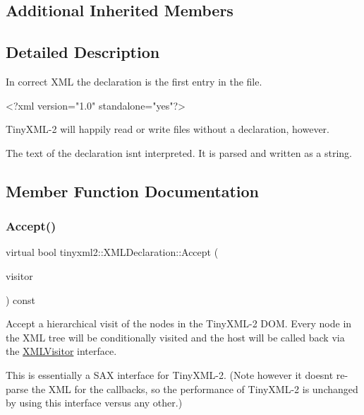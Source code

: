 \subsection*{Additional Inherited Members}


\subsection{Detailed Description}
In correct X\+ML the declaration is the first entry in the file. \begin{DoxyVerb}    <?xml version="1.0" standalone="yes"?>
\end{DoxyVerb}


Tiny\+X\+M\+L-\/2 will happily read or write files without a declaration, however.

The text of the declaration isn\textquotesingle{}t interpreted. It is parsed and written as a string. 

\subsection{Member Function Documentation}
\mbox{\label{classtinyxml2_1_1XMLDeclaration_a5f376019fb34752eb248548f42f32045}} 
\subsubsection{\texorpdfstring{Accept()}{Accept()}}
{\footnotesize\ttfamily virtual bool tinyxml2\+::\+X\+M\+L\+Declaration\+::\+Accept (\begin{DoxyParamCaption}\item[{\mbox{\hyperlink{classtinyxml2_1_1XMLVisitor}{X\+M\+L\+Visitor}} $\ast$}]{visitor }\end{DoxyParamCaption}) const\hspace{0.3cm}{\ttfamily [virtual]}}

Accept a hierarchical visit of the nodes in the Tiny\+X\+M\+L-\/2 D\+OM. Every node in the X\+ML tree will be conditionally visited and the host will be called back via the \mbox{\hyperlink{classtinyxml2_1_1XMLVisitor}{X\+M\+L\+Visitor}} interface.

This is essentially a S\+AX interface for Tiny\+X\+M\+L-\/2. (Note however it doesn\textquotesingle{}t re-\/parse the X\+ML for the callbacks, so the performance of Tiny\+X\+M\+L-\/2 is unchanged by using this interface versus any other.)

